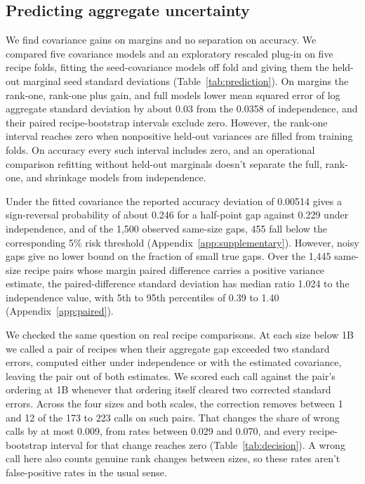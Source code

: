 \subsection{Predicting aggregate uncertainty}
\label{sec:prediction}
We find covariance gains on margins and no separation on accuracy. We compared five covariance models and an exploratory rescaled plug-in on five recipe folds, fitting the seed-covariance models off fold and giving them the held-out marginal seed standard deviations (Table~\ref{tab:prediction}). On margins the rank-one, rank-one plus gain, and full models lower mean squared error of log aggregate standard deviation by about 0.03 from the 0.0358 of independence, and their paired recipe-bootstrap intervals exclude zero. However, the rank-one interval reaches zero when nonpositive held-out variances are filled from training folds. On accuracy every such interval includes zero, and an operational comparison refitting without held-out marginals doesn't separate the full, rank-one, and shrinkage models from independence.

Under the fitted covariance the reported accuracy deviation of 0.00514 gives a sign-reversal probability of about 0.246 for a half-point gap against 0.229 under independence, and of the 1,500 observed same-size gaps, 455 fall below the corresponding 5\% risk threshold (Appendix~\ref{app:supplementary}). However, noisy gaps give no lower bound on the fraction of small true gaps. Over the 1,445 same-size recipe pairs whose margin paired difference carries a positive variance estimate, the paired-difference standard deviation has median ratio 1.024 to the independence value, with 5th to 95th percentiles of 0.39 to 1.40 (Appendix~\ref{app:paired}).

We checked the same question on real recipe comparisons. At each size below 1B we called a pair of recipes when their aggregate gap exceeded two standard errors, computed either under independence or with the estimated covariance, leaving the pair out of both estimates. We scored each call against the pair's ordering at 1B whenever that ordering itself cleared two corrected standard errors. Across the four sizes and both scales, the correction removes between 1 and 12 of the 173 to 223 calls on such pairs. That changes the share of wrong calls by at most 0.009, from rates between 0.029 and 0.070, and every recipe-bootstrap interval for that change reaches zero (Table~\ref{tab:decision}). A wrong call here also counts genuine rank changes between sizes, so these rates aren't false-positive rates in the usual sense.

